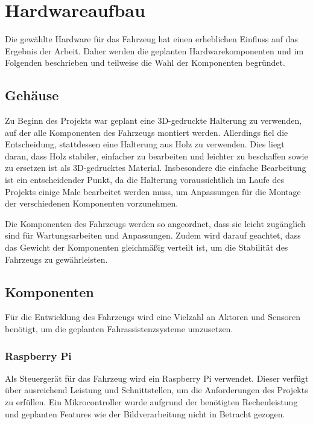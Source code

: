 \section{Hardwareaufbau}
Die gewählte Hardware für das Fahrzeug hat einen erheblichen Einfluss auf das Ergebnis der Arbeit. Daher werden die geplanten Hardwarekomponenten und im Folgenden beschrieben und teilweise die Wahl der Komponenten begründet.
    \subsection{Gehäuse}
    Zu Beginn des Projekts war geplant eine 3D-gedruckte Halterung zu verwenden, auf der alle Komponenten des Fahrzeugs montiert werden. Allerdings fiel die Entscheidung, stattdessen eine Halterung aus Holz zu verwenden. Dies liegt daran, dass Holz stabiler, einfacher zu bearbeiten und leichter zu beschaffen sowie zu ersetzen ist als 3D-gedrucktes Material. Insbesondere die einfache Bearbeitung ist ein entscheidender Punkt, da die Halterung voraussichtlich im Laufe des Projekts einige Male bearbeitet werden muss, um Anpassungen für die Montage der verschiedenen Komponenten vorzunehmen.

    Die Komponenten des Fahrzeugs werden so angeordnet, dass sie leicht zugänglich sind für Wartungsarbeiten und Anpassungen. Zudem wird darauf geachtet, dass das Gewicht der Komponenten gleichmäßig verteilt ist, um die Stabilität des Fahrzeugs zu gewährleisten.

    \subsection{Komponenten}
    Für die Entwicklung des Fahrzeugs wird eine Vielzahl an Aktoren und Sensoren benötigt, um die geplanten Fahrassistenzsysteme umzusetzen. 

        \subsubsection{Raspberry Pi}
        Als Steuergerät für das Fahrzeug wird ein Raspberry Pi verwendet. Dieser verfügt über ausreichend Leistung und Schnittstellen, um die Anforderungen des Projekts zu erfüllen. Ein Mikrocontroller wurde aufgrund der benötigten Rechenleistung und geplanten Features wie der Bildverarbeitung nicht in Betracht gezogen.

